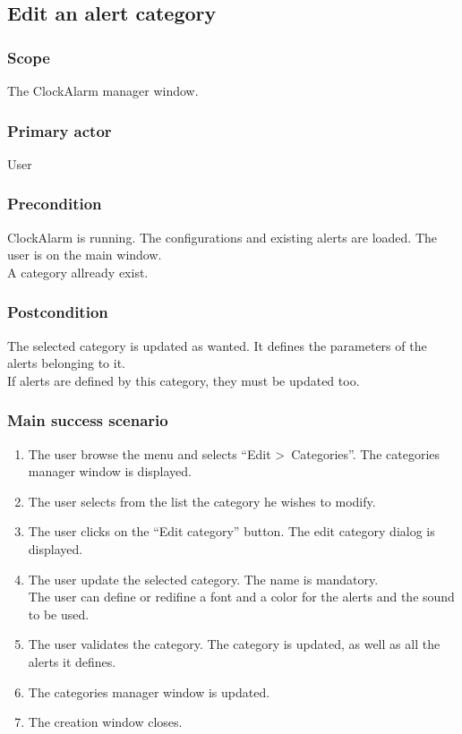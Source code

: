 \subsection{Edit an alert category}

\subsubsection{Scope}
The ClockAlarm manager window.
\subsubsection{Primary actor}
User
\subsubsection{Precondition}
ClockAlarm is running. The configurations and existing alerts are loaded. The user is on the main window.
\\A category allready exist.
\subsubsection{Postcondition}
The selected category is updated as wanted. It defines the parameters of the alerts belonging to it.
\\ If alerts are defined by this category, they must be updated too.
\subsubsection{Main success scenario}
\begin{enumerate}
	\item The user browse the menu and selects ``Edit \textgreater~Categories''. The categories manager window is displayed. 
	\item The user selects from the list the category he wishes to modify.
	\item The user clicks on the ``Edit category'' button. The edit category dialog is displayed.
	\item\label{itm:eaac_enter_sc}The user update the selected category. The name is mandatory. \\The user can define or redifine a font and a color for the alerts and the sound to be used.
	\item\label{itm:eaac_validate_sc} The user validates the category. The category is updated, as well as all the alerts it defines.
	\item The categories manager window is updated.
	\item The creation window closes.
\end{enumerate}

